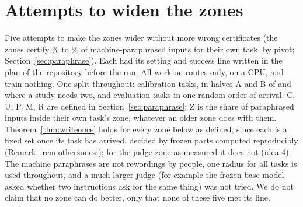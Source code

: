\clearpage
\section{Attempts to widen the zones}
\label{app:widen}

Five attempts to make the \cert{} zones wider without more wrong certificates (the zones certify \WidenRefTfivePLow{}\% to \WidenRefTfivePHigh{}\% of machine-paraphrased inputs for their own task, by pivot; Section~\ref{sec:paraphrase}). Each had its setting and success line written in the plan of the repository before the run. All work on routes only, on a CPU, and train nothing. One split throughout: \WidenTasksCal{} calibration tasks, in halves A and B of \WidenHalfA{} and \WidenHalfB{} where a study needs two, and \WidenTasksEval{} evaluation tasks in one random order of arrival. \textsf{C}, \textsf{U}, \textsf{P}, \textsf{M}, \textsf{R} are defined in Section~\ref{sec:paraphrase}; \textsf{Z} is the share of paraphrased inputs inside their own task's zone, whatever an older zone does with them. Theorem~\ref{thm:writeonce} holds for every zone below as defined, since each is a fixed set once its task has arrived, decided by frozen parts computed reproducibly (Remark~\ref{rem:otherzones}); for the judge zone as measured it does not (idea 4). The machine paraphrases are not rewordings by people, one radius for all tasks is used throughout, and a much larger judge (for example the frozen base model asked whether two instructions ask for the same thing) was not tried. We do not claim that no zone can do better, only that none of these five met its line.


